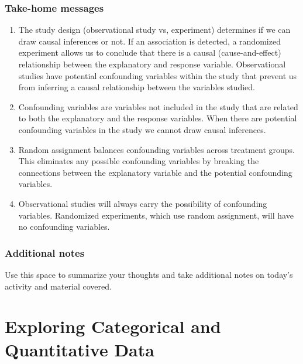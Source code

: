 \documentclass[
]{report}
\begin{document}
\hypertarget{take-home-messages-3}{%
\subsection{Take-home messages}\label{take-home-messages-3}}

\begin{enumerate}
\def\labelenumi{\arabic{enumi}.}
\item
  The study design (observational study vs, experiment) determines if we can draw causal inferences or not. If an association is detected, a randomized experiment allows us to conclude that there is a causal (cause-and-effect) relationship between the explanatory and response variable. Observational studies have potential confounding variables within the study that prevent us from inferring a causal relationship between the variables studied.
\item
  Confounding variables are variables not included in the study that are related to both the explanatory and the response variables. When there are potential confounding variables in the study we cannot draw causal inferences.
\item
  Random assignment balances confounding variables across treatment groups. This eliminates any possible confounding variables by breaking the connections between the explanatory variable and the potential confounding variables.
\item
  Observational studies will always carry the possibility of confounding variables. Randomized experiments, which use random assignment, will have no confounding variables.
\end{enumerate}

\hypertarget{additional-notes-3}{%
\subsection{Additional notes}\label{additional-notes-3}}

Use this space to summarize your thoughts and take additional notes on today's activity and material covered.

\newpage

\hypertarget{exploring-categorical-and-quantitative-data}{%
\chapter{Exploring Categorical and Quantitative Data}\label{exploring-categorical-and-quantitative-data}}
\end{document}

